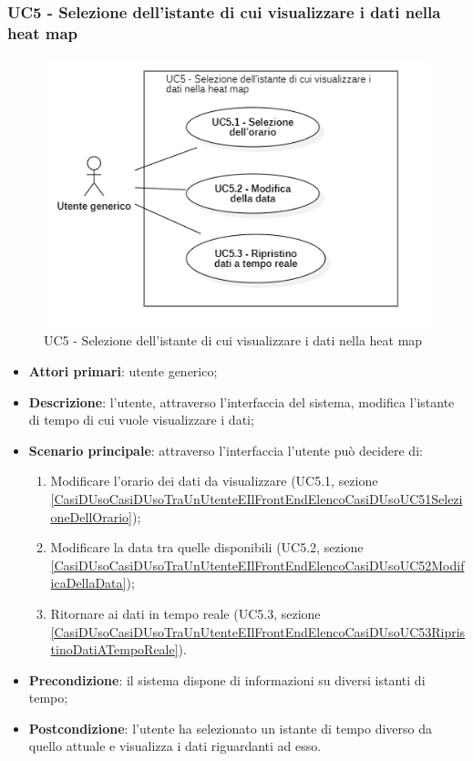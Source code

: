 \subsubsection{UC5 - Selezione dell’istante di cui visualizzare i dati nella heat map
}\label{CasiDUsoCasiDUsoTraUnUtenteEIlFrontEndElencoCasiDUsoUC5SelezioneDellIstanzeDiCuiVisualizzareIDatiNellaHeatmap}%
\begin{center}
	\begin{figure}[H]
		\centering\includegraphics{../immagini/attori_casi/UC5.png}
		\caption{UC5 - Selezione dell’istante di cui visualizzare i dati nella heat map}
	\end{figure}
\end{center}
\begin{itemize}
	\item \textbf{Attori primari}: utente generico;
	\item \textbf{Descrizione}: l’utente, attraverso l’interfaccia del sistema, modifica l’istante di tempo di cui vuole visualizzare i dati;
	\item \textbf{Scenario principale}: attraverso l’interfaccia l’utente può decidere di:
		\begin{enumerate}
			\item Modificare l’orario dei dati da visualizzare (UC5.1, sezione  \ref{CasiDUsoCasiDUsoTraUnUtenteEIlFrontEndElencoCasiDUsoUC51SelezioneDellOrario});
			\item Modificare la data tra quelle disponibili (UC5.2, sezione \ref{CasiDUsoCasiDUsoTraUnUtenteEIlFrontEndElencoCasiDUsoUC52ModificaDellaData});
			\item Ritornare ai dati in tempo reale (UC5.3, sezione \ref{CasiDUsoCasiDUsoTraUnUtenteEIlFrontEndElencoCasiDUsoUC53RipristinoDatiATempoReale}).
		\end{enumerate}
	\item \textbf{Precondizione}: il sistema dispone di informazioni su diversi istanti di tempo;
	\item \textbf{Postcondizione}: l’utente ha selezionato un istante di tempo diverso da quello attuale e visualizza i dati riguardanti ad esso.%
\end{itemize}

